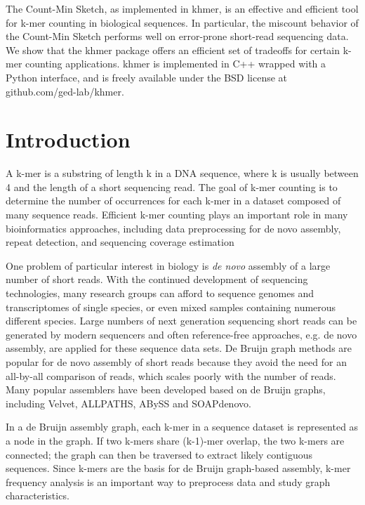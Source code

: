 \documentclass{article}
\begin{document}
The Count-Min Sketch, as implemented in khmer, is an effective and
efficient tool for k-mer counting in biological sequences.  In
particular, the miscount behavior of the Count-Min Sketch performs
well on error-prone short-read sequencing data.  We show that the
khmer package offers an efficient set of tradeoffs for certain k-mer
counting applications.  khmer is implemented in C++ wrapped with a
Python interface, and is freely available under the BSD license at
github.com/ged-lab/khmer.

\section{Introduction}

A k-mer is a substring of length k in a DNA sequence, where k is
usually between 4 and the length of a short sequencing read. The goal
of k-mer counting is to determine the number of occurrences for each
k-mer in a dataset composed of many sequence reads. Efficient k-mer
counting plays an important role in many bioinformatics approaches,
including data preprocessing for de novo assembly, repeat detection,
and sequencing coverage estimation

One problem of particular interest in biology is {\em de novo}
assembly of a large number of short reads.  With the continued
development of sequencing technologies, many research groups can
afford to sequence genomes and transcriptomes of single species, or
even mixed samples containing numerous different
species\cite{Metzker2010}. Large numbers of next generation sequencing
short reads can be generated by modern sequencers and often
reference-free approaches, e.g. de novo assembly, are applied for
these sequence data sets\cite{Miller2010}. De Bruijn graph methods are
popular for de novo assembly of short reads because they avoid the
need for an all-by-all comparison of reads, which scales poorly with
the number of reads\cite{Miller2010}. Many popular assemblers have
been developed based on de Bruijn graphs, including
Velvet\cite{Zerbino2008}, ALLPATHS\cite{Butler2008},
ABySS\cite{Simpson2009} and SOAPdenovo\cite{Li2010}.

In a de Bruijn assembly graph, each k-mer in a sequence dataset is
represented as a node in the graph. If two k-mers share (k-1)-mer
overlap, the two k-mers are connected; the graph can then be
traversed to extract likely contiguous sequences.  Since k-mers are the
basis for de Bruijn graph-based assembly, k-mer frequency analysis
is an important way to preprocess data and study graph characteristics.
\end{document}
